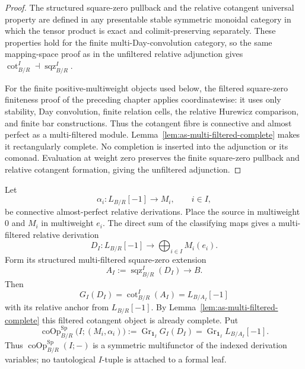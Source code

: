 \begin{proof}
The structured square-zero pullback and the relative cotangent universal
property are defined in any presentable stable symmetric monoidal category in
which the tensor product is exact and colimit-preserving separately.  These
properties hold for the finite multi-Day-convolution category, so the same
mapping-space proof as in the unfiltered relative adjunction gives
$\operatorname{cot}^{I}_{B/R}\dashv\operatorname{sqz}^{I}_{B/R}$.

For the finite positive-multiweight objects used below, the filtered
square-zero finiteness proof of the preceding chapter applies coordinatewise:
it uses only stability, Day convolution, finite relation cells, the relative
Hurewicz comparison, and finite bar constructions.  Thus the cotangent fibre
is connective and almost perfect as a multi-filtered module.
Lemma~\ref{lem:as-multi-filtered-complete} makes it rectangularly complete.
No completion is inserted into the adjunction or its comonad.  Evaluation at
weight zero preserves the finite square-zero pullback and relative cotangent
formation, giving the unfiltered adjunction.
\end{proof}

\begin{construction}
\label{con:as-multi-filtered-colie}
Let
\[
    \alpha_i:L_{B/R}[-1]\longrightarrow M_i,
    \qquad i\in I,
\]
be connective almost-perfect relative derivations.  Place the source in
multiweight $0$ and $M_i$ in multiweight $e_i$.  The direct sum of the
classifying maps gives a multi-filtered relative derivation
\[
    D_I:
    L_{B/R}[-1]
    \longrightarrow
    \bigoplus_{i\in I}M_i(e_i).
\]
Form its structured multi-filtered square-zero extension
\[
    A_I
    :=
    \operatorname{sqz}^{I}_{B/R}(D_I)
    \longrightarrow B.
\]
Then
\[
    G_I(D_I)
    =
    \operatorname{cot}^{I}_{B/R}(A_I)
    =
    L_{B/A_I}[-1]
\]
with its relative anchor from $L_{B/R}[-1]$.  By
Lemma~\ref{lem:as-multi-filtered-complete} this filtered cotangent object is
already complete.  Put
\[
\boxed{
    \operatorname{coOp}^{\mathrm{Sp}}_{B/R}
    \bigl(I;(M_i,\alpha_i)\bigr)
    :=
    \operatorname{Gr}_{\mathbf1_I}
    G_I(D_I)
    =
    \operatorname{Gr}_{\mathbf1_I}L_{B/A_I}[-1].
}
\]
Thus $\operatorname{coOp}^{\mathrm{Sp}}_{B/R}(I;-)$ is a symmetric
multifunctor of the indexed derivation variables; no tautological $I$-tuple is
attached to a formal leaf.
\end{construction}

